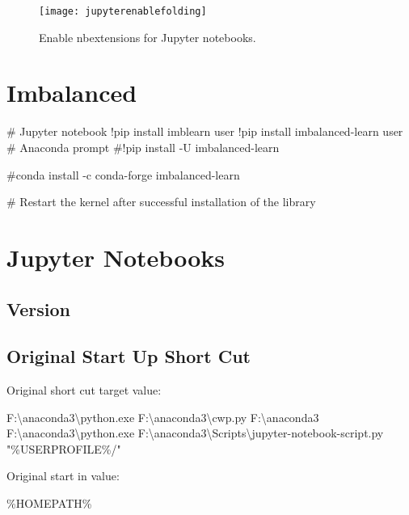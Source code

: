 	\begin{figure}[tbp]
		\centering
		\texttt{[image: jupyterenablefolding]}
		\caption[Enable nbextensions for Jupyter notebooks]{Enable nbextensions for Jupyter notebooks.}
		\label{fig:jupyterenablefolding}
	\end{figure}


	\section{Imbalanced}
	\begin{code}[\codenumbering]{}
		\codeitemnonumber \# Jupyter notebook
		\codeitemnonumber !pip install imblearn \switch{}user
		\codeitemnonumber !pip install imbalanced-learn \switch{}user
		\codeitemnonumber
		\codeitemnonumber \# Anaconda prompt
		\codeitemnonumber \#!pip install -U imbalanced-learn

		\codeitemnonumber \#conda install -c conda-forge imbalanced-learn

		\codeitemnonumber \# Restart the kernel after successful installation of the library
	\end{code}

	\section{Jupyter Notebooks}
	\subsection{Version}

	\subsection{Original Start Up Short Cut}
Original short cut target value:
	\begin{code}[\codenumbering]{}
		\codeitemnonumber F:\textbackslash{}anaconda3\textbackslash{}python.exe F:\textbackslash{}anaconda3\textbackslash{}cwp.py F:\textbackslash{}anaconda3 F:\textbackslash{}anaconda3\textbackslash{}python.exe F:\textbackslash{}anaconda3\textbackslash{}Scripts\textbackslash{}jupyter-notebook-script.py "\%USERPROFILE\%/"
	\end{code}

\noindent Original start in value:
	\begin{code}[\codenumbering]{}
		\codeitemnonumber \%HOMEPATH\%
	\end{code}


